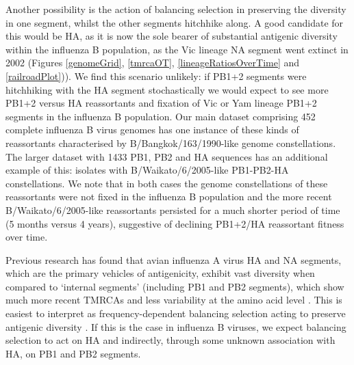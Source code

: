 \documentclass[11pt,oneside,letterpaper]{article}
\begin{document}
Another possibility is the action of balancing selection in preserving the diversity in one segment, whilst the other segments hitchhike along.
A good candidate for this would be HA, as it is now the sole bearer of substantial antigenic diversity within the influenza B population, as the Vic lineage NA segment went extinct in 2002 (Figures \ref{genomeGrid}, \ref{tmrcaOT}, \ref{lineageRatiosOverTime} and \ref{railroadPlot})).
We find this scenario unlikely: if PB1+2 segments were hitchhiking with the HA segment stochastically we would expect to see more PB1+2 versus HA reassortants and fixation of Vic or Yam lineage PB1+2 segments in the influenza B population.
Our main dataset comprising 452 complete influenza B virus genomes has one instance of these kinds of reassortants characterised by B/Bangkok/163/1990-like genome constellations.
The larger dataset with 1433 PB1, PB2 and HA sequences has an additional example of this: isolates with B/Waikato/6/2005-like PB1-PB2-HA constellations.
We note that in both cases the genome constellations of these reassortants were not fixed in the influenza B population and the more recent B/Waikato/6/2005-like reassortants persisted for a much shorter period of time (5 months versus 4 years), suggestive of declining PB1+2/HA reassortant fitness over time.

Previous research has found that avian influenza A virus HA and NA segments, which are the primary vehicles of antigenicity, exhibit vast diversity when compared to `internal segments' (including PB1 and PB2 segments), which show much more recent TMRCAs and less variability at the amino acid level \cite{chen2006,obenauer2006}.
This is easiest to interpret as frequency-dependent balancing selection acting to preserve antigenic diversity \cite{worobey2014}.
If this is the case in influenza B viruses, we expect balancing selection to act on HA and indirectly, through some unknown association with HA, on PB1 and PB2 segments.
\end{document}
